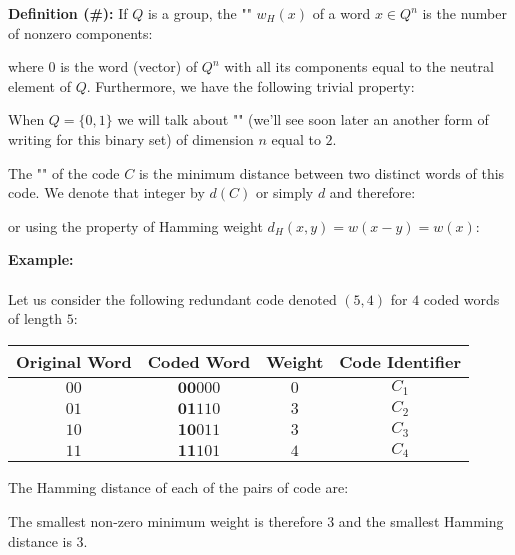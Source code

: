 	\textbf{Definition (\#\mydef):} If $Q$ is a group, the "" $w_H(x)$ of a word $x\in Q^n$ is the number of nonzero components:
	
	where $0$ is the word (vector) of $Q^n$ with all its components equal to the neutral element of $Q$. Furthermore, we have the following trivial property:
	
	\begin{tcolorbox}[title=Remark,colframe=black,arc=10pt]
	When $Q=\{0,1\}$ we will talk about "" (we'll see soon later an another form of writing for this binary set) of dimension $n$ equal to $2$.
	\end{tcolorbox}
	The "" of the code $C$ is the minimum distance between two distinct words of this code. We denote that integer by $d(C)$ or simply $d$ and therefore:
	
	or using the property of Hamming weight $d_H(x,y)=w(x-y)=w(x)$:
	
	\begin{tcolorbox}[colframe=black,colback=white,sharp corners]
	\textbf{{\Large {}}Example:}\\\\
	Let us consider the following redundant code denoted $(5, 4)$ for $4$ coded words of length $5$:
	\begin{table}[H]
	\centering
		\begin{tabular}{|c|c|c|c|}
		\hline
		\rowcolor[HTML]{9B9B9B} 
		\textbf{Original Word} & \textbf{Coded Word} & \textbf{Weight} & \textbf{Code Identifier} \\ \hline
		$00$ & $\pmb{00}000$ & $0$ & $C_1$ \\ \hline
		$01$ & $\pmb{01}110$ & $3$ & $C_2$ \\ \hline
		$10$ & $\pmb{10}011$ & $3$ & $C_3$ \\ \hline
		$11$ & $\pmb{11}101$ & $4$ & $C_4$ \\ \hline
		\end{tabular}
	\end{table}
	The Hamming distance of each of the pairs of code are:
	
	The smallest non-zero minimum weight is therefore $3$ and the smallest Hamming distance is $3$.
	\end{tcolorbox}
	
